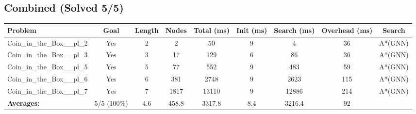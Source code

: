 \documentclass{article}
\begin{document}
\subsection*{Combined (Solved 5/5)}
\begin{tabular}{lcccccccc}
\toprule
Problem & Goal & Length & Nodes & Total (ms) & Init (ms) & Search (ms) & Overhead (ms) & Search \\
\midrule
Coin\_in\_the\_Box\_\_pl\_2 & Yes & 2 & 2 & 50 & 9 & 4 & 36 & A*(GNN) \\
Coin\_in\_the\_Box\_\_pl\_3 & Yes & 3 & 17 & 129 & 6 & 86 & 36 & A*(GNN) \\
Coin\_in\_the\_Box\_\_pl\_5 & Yes & 5 & 77 & 552 & 9 & 483 & 59 & A*(GNN) \\
Coin\_in\_the\_Box\_\_pl\_6 & Yes & 6 & 381 & 2748 & 9 & 2623 & 115 & A*(GNN) \\
Coin\_in\_the\_Box\_\_pl\_7 & Yes & 7 & 1817 & 13110 & 9 & 12886 & 214 & A*(GNN) \\
\textbf{Averages:} & 5/5 (100\%) & 4.6 & 458.8 & 3317.8 & 8.4 & 3216.4 & 92 & \\
\bottomrule
\end{tabular}
\\[0.7cm]
\end{document}
